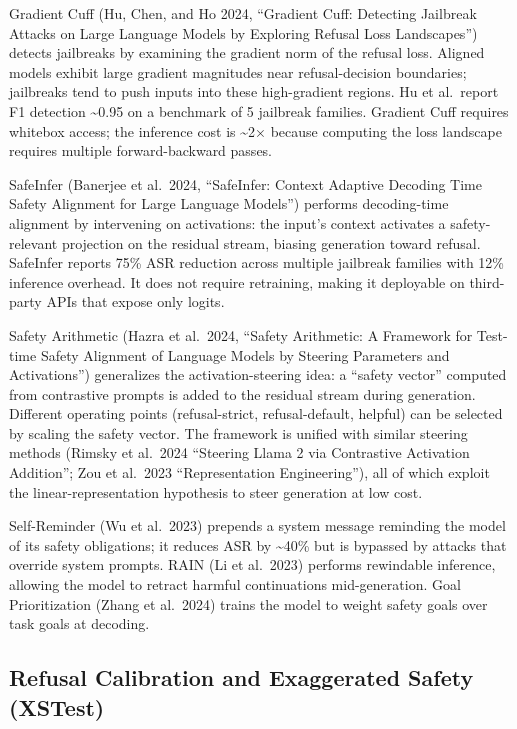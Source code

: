 Gradient Cuff (Hu, Chen, and Ho 2024, ``Gradient Cuff: Detecting Jailbreak Attacks on Large Language Models by Exploring Refusal Loss Landscapes'') detects jailbreaks by examining the gradient norm of the refusal loss. Aligned models exhibit large gradient magnitudes near refusal-decision boundaries; jailbreaks tend to push inputs into these high-gradient regions. Hu et al.~report F1 detection \textasciitilde0.95 on a benchmark of 5 jailbreak families. Gradient Cuff requires whitebox access; the inference cost is \textasciitilde2× because computing the loss landscape requires multiple forward-backward passes.

SafeInfer (Banerjee et al.~2024, ``SafeInfer: Context Adaptive Decoding Time Safety Alignment for Large Language Models'') performs decoding-time alignment by intervening on activations: the input's context activates a safety-relevant projection on the residual stream, biasing generation toward refusal. SafeInfer reports 75\% ASR reduction across multiple jailbreak families with 12\% inference overhead. It does not require retraining, making it deployable on third-party APIs that expose only logits.

Safety Arithmetic (Hazra et al.~2024, ``Safety Arithmetic: A Framework for Test-time Safety Alignment of Language Models by Steering Parameters and Activations'') generalizes the activation-steering idea: a ``safety vector'' computed from contrastive prompts is added to the residual stream during generation. Different operating points (refusal-strict, refusal-default, helpful) can be selected by scaling the safety vector. The framework is unified with similar steering methods (Rimsky et al.~2024 ``Steering Llama 2 via Contrastive Activation Addition''; Zou et al.~2023 ``Representation Engineering''), all of which exploit the linear-representation hypothesis to steer generation at low cost.

Self-Reminder (Wu et al.~2023) prepends a system message reminding the model of its safety obligations; it reduces ASR by \textasciitilde40\% but is bypassed by attacks that override system prompts. RAIN (Li et al.~2023) performs rewindable inference, allowing the model to retract harmful continuations mid-generation. Goal Prioritization (Zhang et al.~2024) trains the model to weight safety goals over task goals at decoding.

\subsection{Refusal Calibration and Exaggerated Safety (XSTest)}\label{refusal-calibration-and-exaggerated-safety-xstest}

